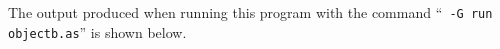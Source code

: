 The output produced when running this program with the command
``{\tt \asharpcmd{} -G run objectb.as}'' is shown below.
{\small

}
\newpage





